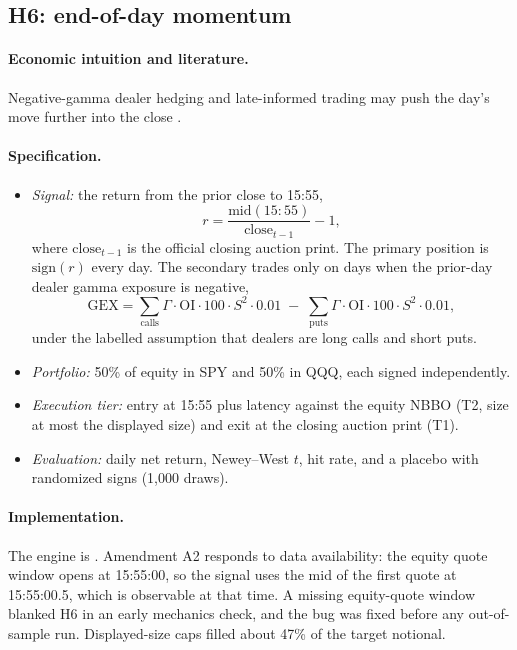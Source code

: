 \documentclass[../main.tex]{subfiles}
\begin{document}
\subsection{H6: end-of-day momentum}\label{sec:h6}

\paragraph{Economic intuition and literature.}
Negative-gamma dealer hedging and late-informed trading may push the day's move further into the close \citep{gaohan2018,baltussen2021}.

\paragraph{Specification.}
\begin{itemize}
\item \emph{Signal:} the return from the prior close to 15:55,
\begin{equation}
r = \frac{\mathrm{mid}(15{:}55)}{\mathrm{close}_{t-1}} - 1,
\end{equation}
where $\mathrm{close}_{t-1}$ is the official closing auction print. The primary position is $\mathrm{sign}(r)$ every day. The secondary trades only on days when the prior-day dealer gamma exposure is negative,
\begin{equation}
\mathrm{GEX} = \sum_{\text{calls}} \Gamma \cdot \mathrm{OI} \cdot 100 \cdot S^{2} \cdot 0.01 \;-\; \sum_{\text{puts}} \Gamma \cdot \mathrm{OI} \cdot 100 \cdot S^{2} \cdot 0.01,
\end{equation}
under the labelled assumption that dealers are long calls and short puts.
\item \emph{Portfolio:} 50\% of equity in SPY and 50\% in QQQ, each signed independently.
\item \emph{Execution tier:} entry at 15:55 plus latency against the equity NBBO (T2, size at most the displayed size) and exit at the closing auction print (T1).
\item \emph{Evaluation:} daily net return, Newey--West $t$, hit rate, and a placebo with randomized signs (1,000 draws).
\end{itemize}

\paragraph{Implementation.}
The engine is . Amendment A2 responds to data availability: the equity quote window opens at 15:55:00, so the signal uses the mid of the first quote at 15:55:00.5, which is observable at that time. A missing equity-quote window blanked H6 in an early mechanics check, and the bug was fixed before any out-of-sample run. Displayed-size caps filled about 47\% of the target notional.
\end{document}
